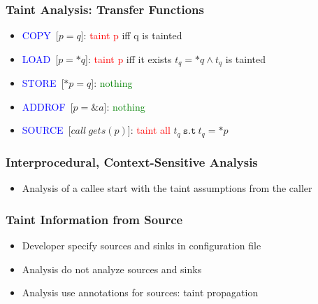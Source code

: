 \documentclass[xcolor=dvipsnames]{beamer}
\begin{document}
\begin{frame}
  \frametitle{Taint Analysis: Transfer Functions} 
	{\large
	\begin{itemize}
	\item \textcolor{blue}{COPY}\ [$p = q$]: \textcolor{red}{taint p} iff q is tainted
   	\vspace{0.2cm}	
	\item \textcolor{blue}{LOAD}\ [$p = *q$]: \textcolor{red}{taint p} iff it exists $t_q = *q \wedge t_q$ is tainted
   	\vspace{0.2cm}		
	\item \textcolor{blue}{STORE}\ [$*p = q$]: \textcolor{green}{nothing}
   	\vspace{0.2cm}		
	\item \textcolor{blue}{ADDROF}\	[$p = \&a$]: \textcolor{green}{nothing}
   	\vspace{0.2cm}		
	\item \textcolor{blue}{SOURCE}\	 [$\mathit{call\ gets(p)}$]: \textcolor{red}{taint all} $t_q\ \mathtt{s.t}\ t_q = *p$ 
	\end{itemize}
}
\end{frame}

\begin{frame}
  \frametitle{Interprocedural, Context-Sensitive Analysis} {
   \Large
   \begin{itemize}
	\item Analysis of a callee start with the taint assumptions from the caller
	\end{itemize}
	}
\end{frame}

\begin{frame}
  \frametitle{Taint Information from Source} 
    {\Large
	\begin{itemize}
	\item Developer specify sources and sinks in configuration file
   	\vspace{0.2cm}	
   	\item Analysis do not analyze sources and sinks
   	\vspace{0.2cm}	     	   		   	
   	\item Analysis use annotations for sources: taint propagation
   	\end{itemize}
	}
\end{frame}
\end{document}
